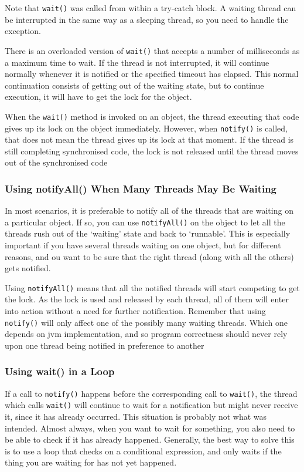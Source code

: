 Note that \verb#wait()# was called from within a try-catch block. A waiting 
thread can be interrupted in the same way as a sleeping thread, so you need to 
handle the exception.

There is an overloaded version of \verb#wait()# that accepts a number of 
milliseconds as a maximum time to wait. If the thread is not interrupted, it 
will continue normally whenever it is notified or the specified timeout has 
elapsed. This normal continuation consists of getting out of the waiting state, 
but to continue execution, it will have to get the lock for the object.

When the \verb#wait()# method is invoked on an object, the thread executing 
that code gives up its lock on the object immediately. However, when 
\verb#notify()# is called, that does not mean the thread gives up its lock at 
that moment. If the thread is still completing synchronised code, the lock is 
not released until the thread moves out of the synchronised code

\subsubsection{Using notifyAll() When Many Threads May Be Waiting}
In most scenarios, it is preferable to notify all of the threads that are 
waiting on a particular object. If so, you can use \verb#notifyAll()# on the 
object to let all the threads rush out of the `waiting' state and back to 
`runnable'. This is especially important if you have several threads waiting on 
one object, but for different reasons, and ou want to be sure that the right 
thread (along with all the others) gets notified.

Using \verb#notifyAll()# means that all the notified threads will start 
competing to get the lock. As the lock is used and released by each thread, all 
of them will enter into action without a need for further notification.  
Remember that using \verb#notify()# will only affect one of the possibly many 
waiting threads. Which one depends on jvm implementation, and so program 
correctness should never rely upon one thread being notified in preference to 
another

\subsubsection{Using wait() in a Loop}
If a call to \verb#notify()# happens before the corresponding call to 
\verb#wait()#, the thread which calls \verb#wait()# will continue to wait for a 
notification but might never receive it, since it has already occurred. This 
situation is probably not what was intended. Almost always, when you want to 
wait for something, you also need to be able to check if it has already 
happened. Generally, the best way to solve this is to use a loop that checks on 
a conditional expression, and only waits if the thing you are waiting for has 
not yet happened.


